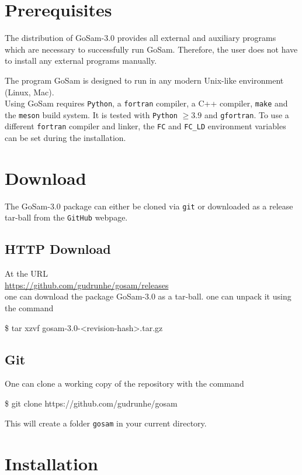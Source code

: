 \documentclass[11pt,a4paper]{refrep}
\newcommand{\gosamversion}{{3{.}0}}
\newcommand{\gosam}{{\sc GoSam}\xspace}
\newcommand{\packagename}{{gosam-\gosamversion-<revision-hash>}}
\begin{document}
\section{Prerequisites}

The distribution of \gosam-\gosamversion{} provides all external and auxiliary programs which are necessary 
to successfully run \gosam. 
Therefore, the user does not have to install any external programs manually.

The program \gosam is designed to run in any modern Unix-like environment (Linux, Mac).\\
Using \gosam requires \texttt{Python}, a \texttt{fortran} compiler, a C++ compiler, \texttt{make} and the \texttt{meson} build system. It is tested with \texttt{Python} $\geq 3.9$ and \texttt{gfortran}.
To use a different {\tt fortran} compiler and linker, the {\tt FC} and {\tt FC\_LD} environment variables can
be set during the installation.


\section{Download}

The \gosam-\gosamversion{} package can either be cloned 
via \texttt{git}
or downloaded as a release tar-ball from the {\tt GitHub} webpage.

\subsection*{HTTP Download}
At the URL \\
\url{https://github.com/gudrunhe/gosam/releases}\\
one can download the package
\gosam-\gosamversion{} as a tar-ball. 
one can unpack it using the command
\begin{example}
\$ tar xzvf \packagename{}.tar.gz
\end{example}

\subsection*{Git}
One can clone a working copy of the repository with the command
\begin{example}
\$ git clone https://github.com/gudrunhe/gosam
\end{example}
This will create a folder \texttt{gosam} in your current directory.

\section{Installation}
\end{document}
